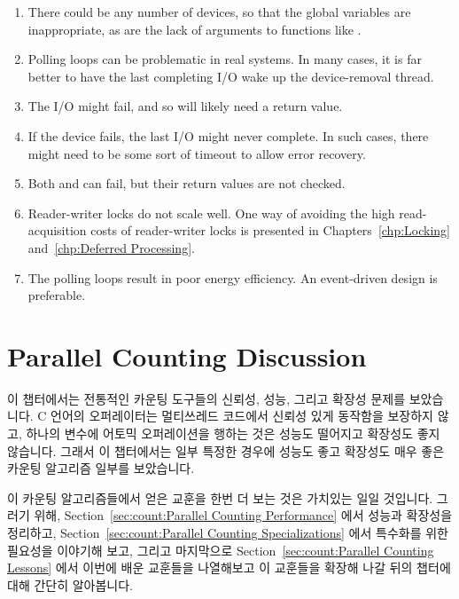 {	\begin{enumerate}
	\item	There could be any number of devices, so that the
		global variables are inappropriate, as are the
		lack of arguments to functions like .
	\item	Polling loops can be problematic in real systems.
		In many cases, it is far better to have the last
		completing I/O wake up the device-removal thread.
	\item	The I/O might fail, and so  will likely
		need a return value.
	\item	If the device fails, the last I/O might never complete.
		In such cases, there might need to be some sort of
		timeout to allow error recovery.
	\item	Both  and  can
		fail, but their return values are not checked.
	\item	Reader-writer locks do not scale well.
		One way of avoiding the high read-acquisition costs
		of reader-writer locks is presented in
		Chapters~\ref{chp:Locking}
		and~\ref{chp:Deferred Processing}.
	\item	The polling loops result in poor energy efficiency.
		An event-driven design is preferable.
	\end{enumerate}
	\fi
} \QuickQuizEnd

\section{Parallel Counting Discussion}
\label{sec:count:Parallel Counting Discussion}

이 챕터에서는 전통적인 카운팅 도구들의 신뢰성, 성능, 그리고 확장성 문제를
보았습니다.
C 언어의 \co{++} 오퍼레이터는 멀티쓰레드 코드에서 신뢰성 있게 동작함을 보장하지
않고, 하나의 변수에 어토믹 오퍼레이션을 행하는 것은 성능도 떨어지고 확장성도
좋지 않습니다.
그래서 이 챕터에서는 일부 특정한 경우에 성능도 좋고 확장성도 매우 좋은 카운팅
알고리즘 일부를 보았습니다.

이 카운팅 알고리즘들에서 얻은 교훈을 한번 더 보는 것은 가치있는 일일 것입니다.
그러기 위해,
Section~\ref{sec:count:Parallel Counting Performance} 에서 성능과 확장성을
정리하고,
Section~\ref{sec:count:Parallel Counting Specializations} 에서 특수화를 위한
필요성을 이야기해 보고,
그리고 마지막으로
Section~\ref{sec:count:Parallel Counting Lessons} 에서 이번에 배운 교훈들을
나열해보고 이 교훈들을 확장해 나갈 뒤의 챕터에 대해 간단히 알아봅니다.
\iffalse

